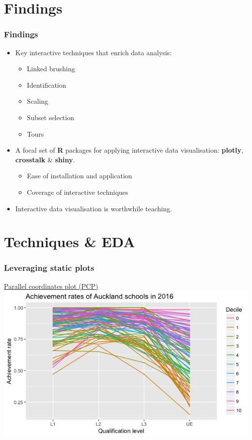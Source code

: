\documentclass{beamer}
\begin{document}
\section{Findings}
\label{sec:findings}

	\begin{frame}
		\frametitle{Findings}
		\begin{itemize}
			\item Key interactive techniques that enrich data analysis:
			\begin{itemize}
				\item Linked brushing
				\item Identification
				\item Scaling
				\item Subset selection
				\item Tours
			\end{itemize}
			\item A focal set of \textbf{R} packages for applying interactive data visualisation: \textbf{plotly}, \textbf{crosstalk} \& \textbf{shiny}.
			\begin{itemize}
				\item Ease of installation and application
				\item Coverage of interactive techniques
			\end{itemize}
		\item Interactive data visualisation is worthwhile teaching.
		\end{itemize}
	\end{frame}

\section{Techniques \& EDA}
\label{sec:techniques}

	\begin{frame}
		\frametitle{Leveraging static plots}
		\href{https://shanl33.shinyapps.io/presentation_pcp/}{Parallel coordinates plot (PCP)}
		\includegraphics[scale=0.45]{files/pcp.jpeg}
	\end{frame}
\end{document}

